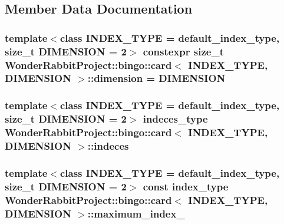 \subsection{Member Data Documentation}
\hypertarget{structWonderRabbitProject_1_1bingo_1_1card_a7be3063bac0a8fc2df63acbb2fa2439f}{
\subsubsection[{dimension}]{\setlength{\rightskip}{0pt plus 5cm}template$<$class I\-N\-D\-E\-X\-\_\-\-T\-Y\-P\-E  = default\-\_\-index\-\_\-type, size\-\_\-t D\-I\-M\-E\-N\-S\-I\-O\-N = 2$>$ constexpr size\-\_\-t {\bf Wonder\-Rabbit\-Project\-::bingo\-::card}$<$ I\-N\-D\-E\-X\-\_\-\-T\-Y\-P\-E, D\-I\-M\-E\-N\-S\-I\-O\-N $>$\-::dimension = D\-I\-M\-E\-N\-S\-I\-O\-N\hspace{0.3cm}{\ttfamily [static]}}}\label{structWonderRabbitProject_1_1bingo_1_1card_a7be3063bac0a8fc2df63acbb2fa2439f}
\hypertarget{structWonderRabbitProject_1_1bingo_1_1card_a9f084cb6bb4bb022bc79f9b95050c9e8}{
\subsubsection[{indeces}]{\setlength{\rightskip}{0pt plus 5cm}template$<$class I\-N\-D\-E\-X\-\_\-\-T\-Y\-P\-E  = default\-\_\-index\-\_\-type, size\-\_\-t D\-I\-M\-E\-N\-S\-I\-O\-N = 2$>$ indeces\-\_\-type {\bf Wonder\-Rabbit\-Project\-::bingo\-::card}$<$ I\-N\-D\-E\-X\-\_\-\-T\-Y\-P\-E, D\-I\-M\-E\-N\-S\-I\-O\-N $>$\-::indeces\hspace{0.3cm}{\ttfamily [private]}}}\label{structWonderRabbitProject_1_1bingo_1_1card_a9f084cb6bb4bb022bc79f9b95050c9e8}
\hypertarget{structWonderRabbitProject_1_1bingo_1_1card_a495660e4f6214f2cc4a426ec6fe140e2}{
\subsubsection[{maximum\-\_\-index\-\_\-}]{\setlength{\rightskip}{0pt plus 5cm}template$<$class I\-N\-D\-E\-X\-\_\-\-T\-Y\-P\-E  = default\-\_\-index\-\_\-type, size\-\_\-t D\-I\-M\-E\-N\-S\-I\-O\-N = 2$>$ const index\-\_\-type {\bf Wonder\-Rabbit\-Project\-::bingo\-::card}$<$ I\-N\-D\-E\-X\-\_\-\-T\-Y\-P\-E, D\-I\-M\-E\-N\-S\-I\-O\-N $>$\-::maximum\-\_\-index\-\_\-\hspace{0.3cm}{\ttfamily [private]}}}\label{structWonderRabbitProject_1_1bingo_1_1card_a495660e4f6214f2cc4a426ec6fe140e2}
